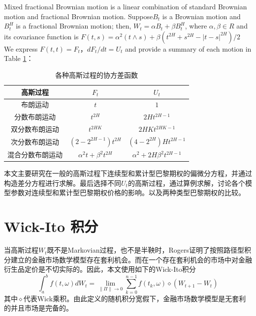 \documentclass{ctexart} %
\begin{document}
Mixed fractional Brownian motion is a linear combination of standard Brownian motion and fractional Brownian motion. Suppose$B_t$ is a Brownian motion and $B_t^H$ is a fractional Brownian motion; then, $W_t=\alpha B_t+\beta B_t^H$, where $\alpha,\beta \in R$ and its covariance function is  $F(t,s)=\alpha^2(t\wedge s)+\beta(t^{2H}+s^{2H}-|t-s|^{2H})/2$ 
We express $F(t,t)=F_t$，$dF_t/dt=U_t$ and provide a summary of each motion in Table \ref{tabl1}：

\begin{table}[htbp]
\centering
\caption{各种高斯过程的协方差函数}
\label{tabl1}
\begin{tabular}{ccc}
\hline
高斯过程& $F_t$ & $U_t$ \\
\hline
布朗运动 & $t$ & $1$ \\
分数布朗运动 & $t^{2H}$ & $2Ht^{2H-1}$ \\
双分数布朗运动 & $t^{2HK}$ & $2HKt^{2HK-1}$ \\
次分数布朗运动 & $(2-2^{2H-1})t^{2H}$ & $(4-2^{2H})Ht^{2H-1}$ \\
混合分数布朗运动 & $\alpha^2t+\beta^2t^{2H}$ & $\alpha^2+2H\beta^2t^{2H-1}$ \\
\hline
\end{tabular}
\end{table}

本文主要研究在一般的高斯过程下连续型和累计型巴黎期权的偏微分方程，并通过构造差分方程进行求解。最后选择不同$U_t$的高斯过程，通过算例求解，讨论各个模型参数对连续型和累计型巴黎期权价格的影响。以及两种类型巴黎期权的比较。


\section{Wick-Ito 积分}
当高斯过程$W_t$既不是Markovian过程，也不是半鞅时，Rogers证明了按照路径型积分建立的金融市场数学模型存在套利机会。而在一个存在套利机会的市场中对金融衍生品定价是不切实际的。因此，本文使用如下的Wick-Ito积分
\begin{equation}
\int_a^bf(t,\omega)dW_t=\lim_{\| \Pi\| \rightarrow0}\sum^{n-1}_{k=0}f(t_k,\omega)\diamond (W_{t+1}-W_t)
\end{equation}
其中$\diamond$代表Wick乘积。由此定义的随机积分宽假下，金融市场数学模型是无套利的并且市场是完备的。
\end{document}
